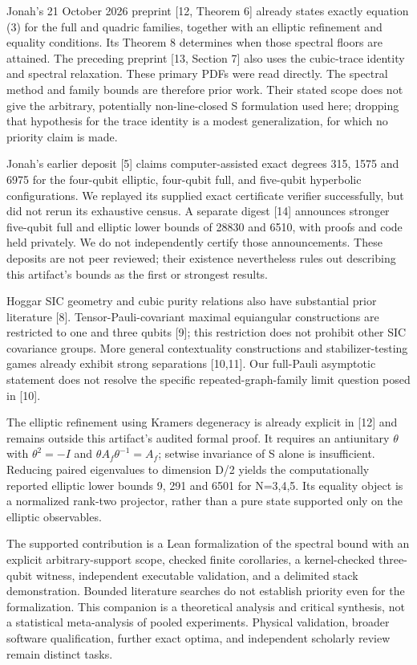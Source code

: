 \documentclass[11pt,letterpaper]{article}
\begin{document}
Jonah's 21 October 2026 preprint {[}12, Theorem 6{]} already states exactly equation (3) for the full and quadric families, together with an elliptic refinement and equality conditions. Its Theorem 8 determines when those spectral floors are attained. The preceding preprint {[}13, Section 7{]} also uses the cubic-trace identity and spectral relaxation. These primary PDFs were read directly. The spectral method and family bounds are therefore prior work. Their stated scope does not give the arbitrary, potentially non-line-closed S formulation used here; dropping that hypothesis for the trace identity is a modest generalization, for which no priority claim is made.

Jonah's earlier deposit {[}5{]} claims computer-assisted exact degrees 315, 1575 and 6975 for the four-qubit elliptic, four-qubit full, and five-qubit hyperbolic configurations. We replayed its supplied exact certificate verifier successfully, but did not rerun its exhaustive census. A separate digest {[}14{]} announces stronger five-qubit full and elliptic lower bounds of 28830 and 6510, with proofs and code held privately. We do not independently certify those announcements. These deposits are not peer reviewed; their existence nevertheless rules out describing this artifact's bounds as the first or strongest results.

Hoggar SIC geometry and cubic purity relations also have substantial prior literature {[}8{]}. Tensor-Pauli-covariant maximal equiangular constructions are restricted to one and three qubits {[}9{]}; this restriction does not prohibit other SIC covariance groups. More general contextuality constructions and stabilizer-testing games already exhibit strong separations {[}10,11{]}. Our full-Pauli asymptotic statement does not resolve the specific repeated-graph-family limit question posed in {[}10{]}.

The elliptic refinement using Kramers degeneracy is already explicit in {[}12{]} and remains outside this artifact's audited formal proof. It requires an antiunitary \(\theta\) with \(\theta^2=-I\) and \(\theta A_f\theta^{-1}=A_f\); setwise invariance of S alone is insufficient. Reducing paired eigenvalues to dimension D/2 yields the computationally reported elliptic lower bounds 9, 291 and 6501 for N=3,4,5. Its equality object is a normalized rank-two projector, rather than a pure state supported only on the elliptic observables.

The supported contribution is a Lean formalization of the spectral bound with an explicit arbitrary-support scope, checked finite corollaries, a kernel-checked three-qubit witness, independent executable validation, and a delimited stack demonstration. Bounded literature searches do not establish priority even for the formalization. This companion is a theoretical analysis and critical synthesis, not a statistical meta-analysis of pooled experiments. Physical validation, broader software qualification, further exact optima, and independent scholarly review remain distinct tasks.
\end{document}
